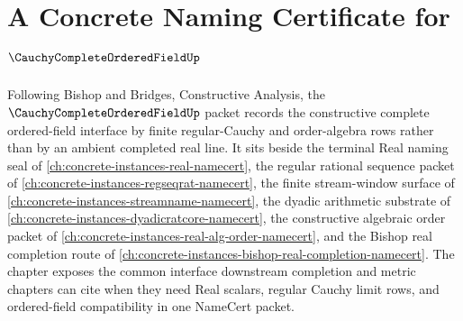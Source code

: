 \chapter{A Concrete Naming Certificate for $\CauchyCompleteOrderedFieldUp$}
\label{ch:concrete-instances-cauchy-complete-ordered-field-namecert}

Following Bishop and Bridges, Constructive Analysis, the $\CauchyCompleteOrderedFieldUp$ packet records the constructive complete ordered-field interface by finite regular-Cauchy and order-algebra rows rather than by an ambient completed real line. It sits beside the terminal Real naming seal of \autoref{ch:concrete-instances-real-namecert}, the regular rational sequence packet of \autoref{ch:concrete-instances-regseqrat-namecert}, the finite stream-window surface of \autoref{ch:concrete-instances-streamname-namecert}, the dyadic arithmetic substrate of \autoref{ch:concrete-instances-dyadicratcore-namecert}, the constructive algebraic order packet of \autoref{ch:concrete-instances-real-alg-order-namecert}, and the Bishop real completion route of \autoref{ch:concrete-instances-bishop-real-completion-namecert}. The chapter exposes the common interface downstream completion and metric chapters can cite when they need Real scalars, regular Cauchy limit rows, and ordered-field compatibility in one NameCert packet.

